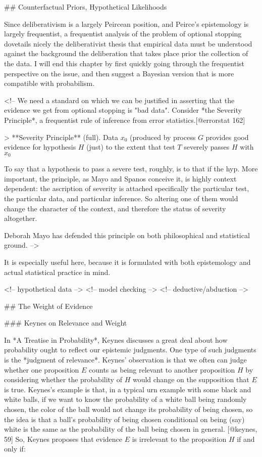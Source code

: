 \#\# Counterfactual Priors, Hypothetical Likelihoods

Since deliberativism is a largely Peircean position, and Peirce's
epistemology is largely frequentist, a frequentist analysis of the
problem of optional stopping dovetails nicely the deliberativist thesis
that empirical data must be understood against the background the
deliberation that takes place prior the collection of the data. I will
end this chapter by first quickly going through the frequentist
perspective on the issue, and then suggest a Bayesian version that is
more compatible with probabilism.

\textless{}!-- We need a standard on which we can be justified in
asserting that the evidence we get from optional stopping is "bad data".
Consider *the Severity Principle*, a frequentist rule of inference from
error statistics.{[}@errorstat 162{]}

\textgreater{} **Severity Principle** (full). Data \(x_0\) (produced by
process \(G\) provides good evidence for hypothesis \(H\) (just) to the
extent that test \(T\) severely passes \(H\) with \(x_0\)

To say that a hypothesis to pass a severe test, roughly, is to that if
the hyp. More important, the principle, as Mayo and Spanos conceive it,
is highly context dependent: the ascription of severity is attached
specifically the particular test, the particular data, and particular
inference. So altering one of them would change the character of the
context, and therefore the status of severity altogether.

Deborah Mayo has defended this principle on both philosophical and
statistical ground. --\textgreater{}

It is especially useful here, because it is formulated with both
epistemology and actual statistical practice in mind.

\textless{}!-- hypothetical data --\textgreater{} \textless{}!-- model
checking --\textgreater{} \textless{}!-- deductive/abduction
--\textgreater{}

\#\# The Weight of Evidence

\#\#\# Keynes on Relevance and Weight

In *A Treatise in Probability*, Keynes discusses a great deal about how
probability ought to reflect our epistemic judgments. One type of such
judgments is the *judgment of relevance*. Keynes' observation is that we
often can judge whether one proposition \(E\) counts as being relevant
to another proposition \(H\) by considering whether the probability of
\(H\) would change on the supposition that \(E\) is true. Keynes's
example is that, in a typical urn example with some black and white
balls, if we want to know the probability of a white ball being randomly
chosen, the color of the ball would not change its probability of being
chosen, so the idea is that a ball's probability of being chosen
conditional on being (say) white is the same as the probability of the
ball being chosen in general. {[}@keynes, 59{]} So, Keynes proposes that
evidence \(E\) is irrelevant to the proposition \(H\) if and only if:

